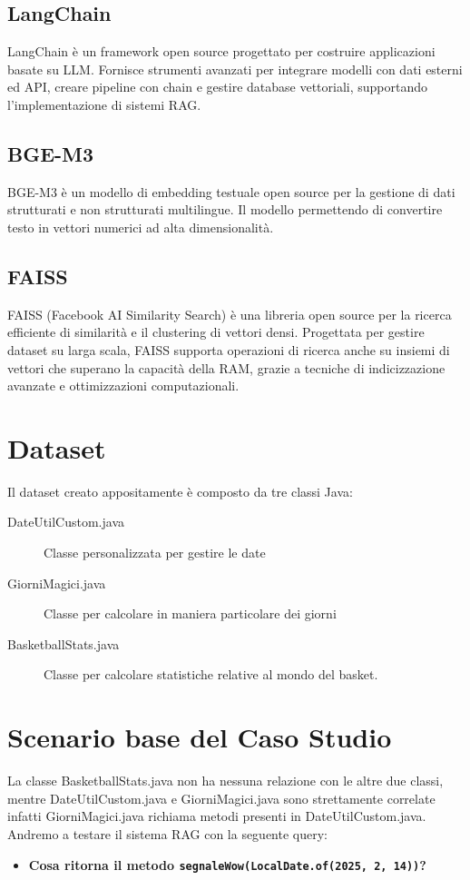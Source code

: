 \documentclass[12pt,a4paper,openright,twoside]{book}
\begin{document}
\subsection{LangChain}
LangChain \cite{langchain} è un framework open source progettato per costruire applicazioni basate su LLM.
Fornisce strumenti avanzati per integrare modelli con dati esterni ed API, creare pipeline con chain
e gestire database vettoriali, supportando l'implementazione di sistemi RAG.

\subsection{BGE-M3}
BGE-M3 \cite{bge-m3} è un modello di embedding testuale open source per la gestione di dati strutturati e non strutturati multilingue.
Il modello permettendo di convertire testo in vettori numerici ad alta dimensionalità.

\subsection{FAISS}
FAISS (Facebook AI Similarity Search) \cite{faiss} è una libreria open source per la ricerca efficiente di similarità e il clustering di vettori densi.
Progettata per gestire dataset su larga scala, FAISS supporta operazioni di ricerca anche su insiemi di vettori che superano la capacità della RAM, grazie a tecniche di indicizzazione avanzate e ottimizzazioni computazionali.

\section{Dataset}
Il dataset creato appositamente è composto da tre classi Java:

\begin{description}
    \item[DateUtilCustom.java] Classe personalizzata per gestire le date
    \item[GiorniMagici.java] Classe per calcolare in maniera particolare dei giorni
    \item[BasketballStats.java] Classe per calcolare statistiche relative al mondo del basket.
\end{description}

\section{Scenario base del Caso Studio}
La classe BasketballStats.java non ha nessuna relazione con le altre due classi,
mentre DateUtilCustom.java e GiorniMagici.java sono strettamente correlate infatti GiorniMagici.java richiama metodi presenti in DateUtilCustom.java.
Andremo a testare il sistema RAG con la seguente query: 
\begin{itemize}
    \item \textbf{Cosa ritorna il metodo \texttt{segnaleWow(LocalDate.of(2025, 2, 14))}?}
\end{itemize}
\end{document}
